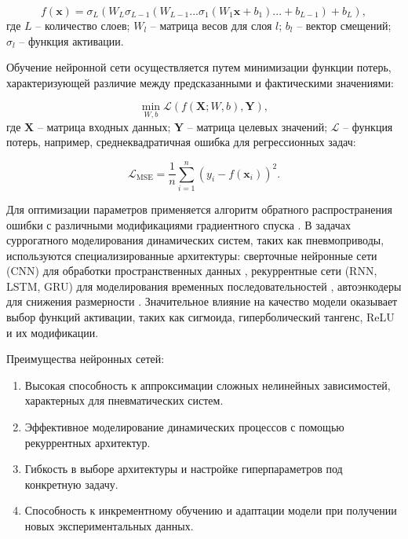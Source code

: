 \begin{equation}
    f(\mathbf{x}) = \sigma_L(W_L\sigma_{L-1}(W_{L-1}...\sigma_1(W_1 \mathbf{x} + b_1)... + b_{L-1}) + b_L),
\end{equation}
где $L$ -- количество слоев;
$W_l$ -- матрица весов для слоя $l$;
$b_l$ -- вектор смещений;
$\sigma_l$ -- функция активации.

Обучение нейронной сети осуществляется путем минимизации функции
потерь, характеризующей различие между предсказанными и фактическими значениями:

\begin{equation}
    \min_{W, b} \mathcal{L}(f(\mathbf{X}; W, b), \mathbf{Y}),
\end{equation}
где $\mathbf{X}$ -- матрица входных данных;
$\mathbf{Y}$ -- матрица целевых значений;
$\mathcal{L}$ -- функция потерь, например, среднеквадратичная ошибка для регрессионных задач:

\begin{equation}
    \mathcal{L}_{\text{MSE}} = \frac{1}{n} \sum_{i=1}^{n} (y_i - f(\mathbf{x}_i))^2.
\end{equation}

Для оптимизации параметров применяется алгоритм обратного распространения ошибки с различными модификациями
градиентного спуска \cite{Ghojogh2024Learning}. В задачах суррогатного моделирования динамических систем,
таких как пневмоприводы, используются специализированные архитектуры: сверточные нейронные сети (CNN) для обработки
пространственных данных \cite{Zhu2021Spatial}, рекуррентные сети (RNN, LSTM, GRU) для моделирования временных
последовательностей \cite{Zarzycki2021LSTM}, автоэнкодеры для снижения размерности \cite{Kaur2021Variational}. Значительное
влияние на качество модели оказывает выбор функций активации, таких как сигмоида, гиперболический тангенс, ReLU и их
модификации.

Преимущества нейронных сетей:

\begin{enumerate}
    \item Высокая способность к аппроксимации сложных нелинейных зависимостей, характерных для пневматических систем.
    \item Эффективное моделирование динамических процессов с помощью рекуррентных архитектур.
    \item Гибкость в выборе архитектуры и настройке гиперпараметров под конкретную задачу.
    \item Способность к инкрементному обучению и адаптации модели при получении новых экспериментальных данных.
\end{enumerate}

